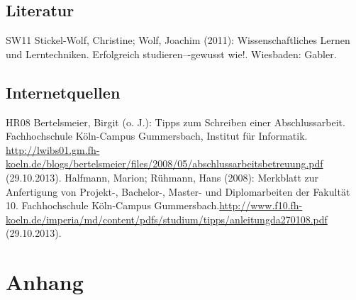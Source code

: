 \documentclass[a4paper,12pt,oneside]{article}
\begin{document}
     \subsection{Literatur}
     \renewcommand{\refname}{} %
     \begin{thebibliography}{SW11} %
        Stickel-Wolf, Christine; Wolf, Joachim (2011): Wissenschaftliches Lernen und Lerntechniken. Erfolgreich studieren–-gewusst wie!. Wiesbaden: Gabler. 
     \end{thebibliography} 
          
     \subsection{Internetquellen}
     \begin{thebibliography}{HR08} %
       Bertelsmeier, Birgit (o. J.): Tipps zum Schrei\-b\-en ei\-n\-er Ab\-sch\-luss\-ar\-beit. Fach\-hoch\-schu\-le Köln-Campus Gummersbach, Institut für Informatik. \url{http://lwibs01.gm.fh-koeln.de/blogs/bertelsmeier/files/2008/05/abschlussarbeitsbetreuung.pdf} (29.10.2013).
         Halfmann, Marion; Rühmann, Hans (2008): Merkblatt zur Anfertigung von Projekt-, Bachelor-, Master- und Diplomarbeiten der Fakultät 10. Fachhochschule Köln-Campus Gummersbach.\url{http://www.f10.fh-koeln.de/imperia/md/content/pdfs/studium/tipps/anleitungda270108.pdf} (29.10.2013).
     \end{thebibliography} 
  

  \newpage
  \setcounter{section}{0} %
  \renewcommand*\thesection{\Alph{section}} %
  \section{Anhang}\label{anhang}
\end{document}
